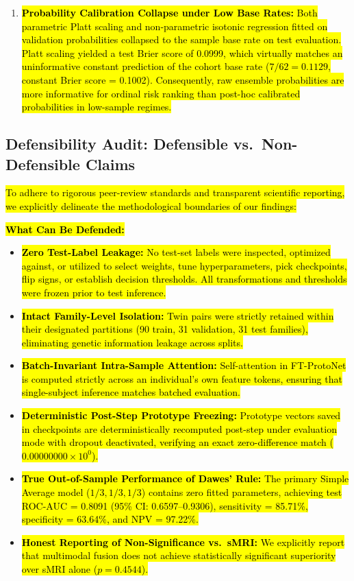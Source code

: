 \documentclass[10pt,letterpaper]{article}
\begin{document}
\begin{enumerate}
    \item \hl{\textbf{Probability Calibration Collapse under Low Base Rates:} Both parametric Platt scaling and non-parametric isotonic regression fitted on validation probabilities collapsed to the sample base rate on test evaluation. Platt scaling yielded a test Brier score of 0.0999, which virtually matches an uninformative constant prediction of the cohort base rate ($7/62 = 0.1129$, constant Brier score = 0.1002). Consequently, raw ensemble probabilities are more informative for ordinal risk ranking than post-hoc calibrated probabilities in low-sample regimes.}
\end{enumerate}

\subsection*{Defensibility Audit: Defensible vs.\ Non-Defensible Claims}

\hl{To adhere to rigorous peer-review standards and transparent scientific reporting, we explicitly delineate the methodological boundaries of our findings:}

\hl{\textbf{What Can Be Defended:}}
\begin{itemize}
    \item \hl{\textbf{Zero Test-Label Leakage:} No test-set labels were inspected, optimized against, or utilized to select weights, tune hyperparameters, pick checkpoints, flip signs, or establish decision thresholds. All transformations and thresholds were frozen prior to test inference.}
    \item \hl{\textbf{Intact Family-Level Isolation:} Twin pairs were strictly retained within their designated partitions (90 train, 31 validation, 31 test families), eliminating genetic information leakage across splits.}
    \item \hl{\textbf{Batch-Invariant Intra-Sample Attention:} Self-attention in FT-ProtoNet is computed strictly across an individual's own feature tokens, ensuring that single-subject inference matches batched evaluation.}
    \item \hl{\textbf{Deterministic Post-Step Prototype Freezing:} Prototype vectors saved in checkpoints are deterministically recomputed post-step under evaluation mode with dropout deactivated, verifying an exact zero-difference match ($0.00000000\times 10^0$).}
    \item \hl{\textbf{True Out-of-Sample Performance of Dawes' Rule:} The primary Simple Average model ($1/3, 1/3, 1/3$) contains zero fitted parameters, achieving test ROC-AUC = 0.8091 (95\% CI: 0.6597--0.9306), sensitivity = 85.71\%, specificity = 63.64\%, and NPV = 97.22\%.}
    \item \hl{\textbf{Honest Reporting of Non-Significance vs.\ sMRI:} We explicitly report that multimodal fusion does not achieve statistically significant superiority over sMRI alone ($p = 0.4544$).}
\end{itemize}
\end{document}
